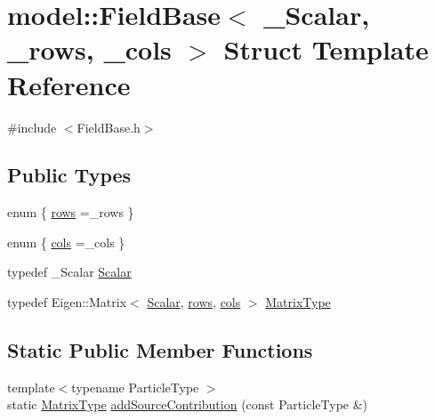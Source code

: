 \hypertarget{structmodel_1_1_field_base}{}\section{model\+:\+:Field\+Base$<$ \+\_\+\+Scalar, \+\_\+rows, \+\_\+cols $>$ Struct Template Reference}
\label{structmodel_1_1_field_base}


{\ttfamily \#include $<$Field\+Base.\+h$>$}

\subsection*{Public Types}
\begin{DoxyCompactItemize}
\item 
enum \{ \hyperlink{structmodel_1_1_field_base_a2b5c52dfd4efa6f57bd43131b4d4f9bcac96775f58d3756f4a74c0009f4618969}{rows} =\+\_\+rows
 \}
\item 
enum \{ \hyperlink{structmodel_1_1_field_base_abe4aa53dc71d5bdd1638bcaf74179c6ca610bda6bda842eba5df9a4ca957db98d}{cols} =\+\_\+cols
 \}
\item 
typedef \+\_\+\+Scalar \hyperlink{structmodel_1_1_field_base_a7719dfb862a0e36c4a1717654d1997b2}{Scalar}
\item 
typedef Eigen\+::\+Matrix$<$ \hyperlink{structmodel_1_1_field_base_a7719dfb862a0e36c4a1717654d1997b2}{Scalar}, \hyperlink{structmodel_1_1_field_base_a2b5c52dfd4efa6f57bd43131b4d4f9bcac96775f58d3756f4a74c0009f4618969}{rows}, \hyperlink{structmodel_1_1_field_base_abe4aa53dc71d5bdd1638bcaf74179c6ca610bda6bda842eba5df9a4ca957db98d}{cols} $>$ \hyperlink{structmodel_1_1_field_base_a2a46afe1dafac6e3d1c95d32fc9a58a3}{Matrix\+Type}
\end{DoxyCompactItemize}
\subsection*{Static Public Member Functions}
\begin{DoxyCompactItemize}
\item 
{\footnotesize template$<$typename Particle\+Type $>$ }\\static \hyperlink{structmodel_1_1_field_base_a2a46afe1dafac6e3d1c95d32fc9a58a3}{Matrix\+Type} \hyperlink{structmodel_1_1_field_base_a74b45e5515da76e1975b50d7620eabe8}{add\+Source\+Contribution} (const Particle\+Type \&)
\end{DoxyCompactItemize}


